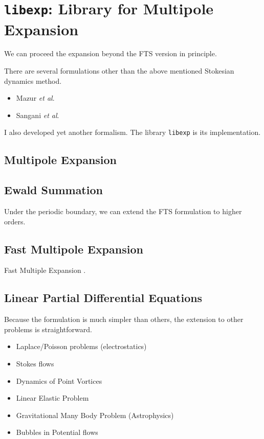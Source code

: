 \documentclass{book}
\begin{document}
\chapter{{\tt libexp}:
  Library for Multipole Expansion}
\label{chp:libexp}
We can proceed the expansion beyond the FTS version in principle.

There are several formulations other than the above mentioned
Stokesian dynamics method.
\begin{itemize}
\item Mazur {\it et al}.
\item Sangani {\it et al}.
\end{itemize}
I also developed yet another formalism.\cite{Ichiki2002}
The library {\tt libexp} is its implementation.


\section{Multipole Expansion}


\section{Ewald Summation}
Under the periodic boundary,
we can extend the FTS formulation to higher orders.



\section{Fast Multipole Expansion}
Fast Multiple Expansion
\cite{greengard,GreengardRokhlin1987}.




\section{Linear Partial Differential Equations}
Because the formulation is much simpler than others,
the extension to other problems is straightforward.

\begin{itemize}
\item Laplace/Poisson problems (electrostatics)
\item Stokes flows
\item Dynamics of Point Vortices
\item Linear Elastic Problem
\item Gravitational Many Body Problem (Astrophysics)
\item Bubbles in Potential flows
\end{itemize}
\end{document}
